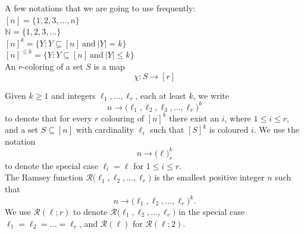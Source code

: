 \documentclass[12pt]{report}
\def\N{\mathbb N}
\def\R{\mathcal R}
\def\l{\ell}
\begin{document}
\noindent A few notations that we are going to use frequently: \\[10pt]
$[n]=\{1,2,3,\ldots,n\}$ \\[5pt]
$\N=\{1,2,3,\ldots \}$ \\[5pt]
$[n]^k=\{Y: Y \subseteq [n] \:\text{and}\: |Y| = k\}$ \\[5pt]
$[n]^{\le k}=\{Y: Y \subseteq [n] \:\text{and}\: |Y| \le k\}$ \\[5pt]

\noindent An $r$-coloring of a set $S$ is a map
\[ \chi: S \rightarrow [r] \]

\noindent Given $k \ge 1$ and integers ${\l}_1,\ldots,{\l}_r$, each at least $k$, we write 
\[ n \rightarrow \big(\l_{1},\l_{2},\l_{3}, \ldots,\l_{r}\big)^k \] 
to denote that for every $r$ colouring of $[n]^k$ there exist an $i$, where $1 \le i \le r$, and a set $S \subseteq[n]$ with cardinality ${\l}_i$ such that  $[S]^k$ is coloured $i$. We use the notation 
\[ n \rightarrow \big(\l\big)^k_r \]
to denote the special case $\l_i=\l$ for $1 \le i \le r$. \\

\noindent The Ramsey function ${\R}\big(\l_{1},\l_{2}, \ldots ,\l_{r}\big)$ is the smallest positive integer $n$ such that 
\[ n\rightarrow \big(\l_{1},\l_{2}, \ldots ,\l_{r}\big)^k. \]
We use $\R(\l;r)$ to denote $\R \big(\l_{1},\l_{2}, \ldots ,\l_{r} \big)$ in the special case $\l_{1}=\l_{2}=\dots =\l_{r}$, and $\R(\l)$ for $\R(\l;2)$. \\
\end{document}
